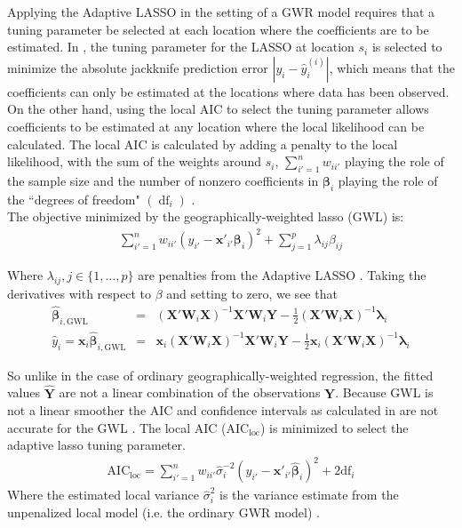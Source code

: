 \documentclass[authoryear, review, 11pt]{elsarticle}
\DeclareMathOperator*{\df}{\mbox{df}}
\begin{document}
	Applying the Adaptive LASSO in the setting of a GWR model requires that a tuning parameter be selected at each location where the coefficients are to be estimated. In \cite{Wheeler:2009}, the tuning parameter for the LASSO at location $s_i$ is selected to minimize the absolute jackknife prediction error $|y_i - \hat{y}_i^{(i)}|$, which means that the coefficients can only be estimated at the locations where data has been observed. On the other hand, using the local AIC to select the tuning parameter allows coefficients to be estimated at any location where the local likelihood can be calculated. The local AIC is calculated by adding a penalty to the local likelihood, with the sum of the weights around $s_i$, $\sum_{i'=1}^n w_{ii'}$ playing the role of the sample size and the number of nonzero coefficients in $\bm{\beta}_i$ playing the role of the ``degrees of freedom" $\left( \df_i \right)$ \citep{Zou:2007}.\\


	The objective minimized by the geographically-weighted lasso (GWL) is:	
	\begin{eqnarray}
		\sum_{i'=1}^n w_{ii'} \left(y_{i'} - \bm{x}'_{i'} \bm{\beta}_i \right)^2 + \sum_{j=1}^p \lambda_{ij} \beta_{ij}
	\end{eqnarray}
	
	Where $\lambda_{ij}, j \in \{1, \dots, p\}$ are penalties from the Adaptive LASSO \citep{Zou:2006}. Taking the derivatives with respect to $\beta$ and setting to zero, we see that
	\begin{eqnarray}
		\hat{\bm{\beta}}_{i, \mbox{GWL}} &=& \left( \bm{X}'\bm{W}_i\bm{X} \right)^{-1}  \bm{X}'\bm{W}_i\bm{Y}  - \frac{1}{2} \left(\bm{X}'\bm{W}_i\bm{X} \right)^{-1} \bm{\lambda}_i\\
		\hat{y}_i = \bm{x}_i \hat{\bm{\beta}}_{i, \mbox{GWL}} &=&  \bm{x}_i \left( \bm{X}'\bm{W}_i\bm{X} \right)^{-1}  \bm{X}'\bm{W}_i\bm{Y}  - \frac{1}{2} \bm{x}_i \left(\bm{X}'\bm{W}_i\bm{X} \right)^{-1} \bm{\lambda}_i
	\end{eqnarray}
	
	So unlike in the case of ordinary geographically-weighted regression, the fitted values $\hat{\bm{Y}}$ are not a linear combination of the observations $\bm{Y}$. Because GWL is not a linear smoother the AIC and confidence intervals as calculated in \cite{Fotheringham:2002} are not accurate for the GWL \citep{Zou:2006}. The local AIC ($\mbox{AIC}_{\mbox{loc}}$) is minimized to select the adaptive lasso tuning parameter.
		\begin{eqnarray}
		\mbox{AIC}_{\mbox{loc}} = \sum_{i'=1}^n w_{ii'} \hat{\sigma}_i^{-2} \left( y_{i'} - \bm{x}'_{i'} \hat{\bm{\beta}}_i \right)^2 + 2 \mbox{df}_i
	\end{eqnarray}	
	Where the estimated local variance $\hat{\sigma}_i^2$ is the variance estimate from the unpenalized local model (i.e. the ordinary GWR model) \citep{Zou:2007}.\\
	
\end{document}
